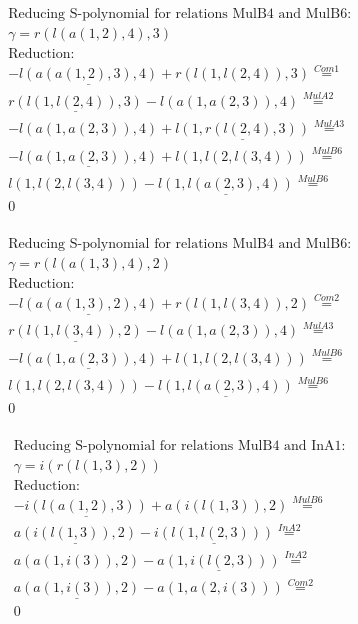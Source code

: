 \documentclass[11pt]{amsart}
\begin{document}
\begin{align*} 
& \text{Reducing S-polynomial for relations MulB4 and MulB6:} \\ 
& \gamma = r(l(a(1,2),4),3) \\ 
& \text{Reduction}: \\& - \underline{l(a(a(1,2),3),4)} + r(l(1,l(2,4)),3) \stackrel{ Com1 }{=}  \\ 
&\underline{r(l(1,l(2,4)),3)} - l(a(1,a(2,3)),4) \stackrel{ MulA2 }{=}  \\ 
& - l(a(1,a(2,3)),4) + \underline{l(1,r(l(2,4),3))} \stackrel{ MulA3 }{=}  \\ 
& - \underline{l(a(1,a(2,3)),4)} + l(1,l(2,l(3,4))) \stackrel{ MulB6 }{=}  \\ 
&l(1,l(2,l(3,4))) - \underline{l(1,l(a(2,3),4))} \stackrel{ MulB6 }{=}  \\ 
&0\\ 
\end{align*} 
 
\begin{align*} 
& \text{Reducing S-polynomial for relations MulB4 and MulB6:} \\ 
& \gamma = r(l(a(1,3),4),2) \\ 
& \text{Reduction}: \\& - \underline{l(a(a(1,3),2),4)} + r(l(1,l(3,4)),2) \stackrel{ Com2 }{=}  \\ 
&\underline{r(l(1,l(3,4)),2)} - l(a(1,a(2,3)),4) \stackrel{ MulA3 }{=}  \\ 
& - \underline{l(a(1,a(2,3)),4)} + l(1,l(2,l(3,4))) \stackrel{ MulB6 }{=}  \\ 
&l(1,l(2,l(3,4))) - \underline{l(1,l(a(2,3),4))} \stackrel{ MulB6 }{=}  \\ 
&0\\ 
\end{align*} 
 
\begin{align*} 
& \text{Reducing S-polynomial for relations MulB4 and InA1:} \\ 
& \gamma = i(r(l(1,3),2)) \\ 
& \text{Reduction}: \\& - \underline{i(l(a(1,2),3))} + a(i(l(1,3)),2) \stackrel{ MulB6 }{=}  \\ 
&\underline{a(i(l(1,3)),2)} - \underline{i(l(1,l(2,3)))} \stackrel{ InA2 }{=}  \\ 
&a(a(1,i(3)),2) - \underline{a(1,i(l(2,3)))} \stackrel{ InA2 }{=}  \\ 
&\underline{a(a(1,i(3)),2)} - a(1,a(2,i(3))) \stackrel{ Com2 }{=}  \\ 
&0\\ 
\end{align*} 
 
\end{document}
